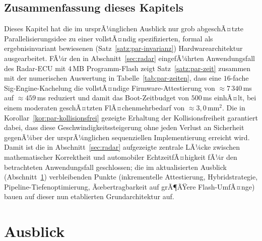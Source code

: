 ﻿\documentclass[a4paper,12pt]{article}
\theoremstyle{definition}
\begin{document}
\subsection{Zusammenfassung dieses Kapitels}

Dieses Kapitel hat die im ursprÃ¼nglichen Ausblick nur grob abgeschÃ¤tzte Parallelisierungsidee zu einer vollstÃ¤ndig spezifizierten, formal als ergebnisinvariant bewiesenen (Satz~\ref{satz:par-invarianz}) Hardwarearchitektur ausgearbeitet. FÃ¼r den in Abschnitt~\ref{sec:radar} eingefÃ¼hrten Anwendungsfall des Radar-ECU mit $4$\,MB Programm-Flash zeigt Satz~\ref{satz:par-zeit} zusammen mit der numerischen Auswertung in Tabelle~\ref{tab:par-zeiten}, dass eine $16$-fache Sig-Engine-Kachelung die vollstÃ¤ndige Firmware-Attestierung von $\approx 7\,340$\,ms auf $\approx 459$\,ms reduziert und damit das Boot-Zeitbudget von $500$\,ms einhÃ¤lt, bei einem moderaten geschÃ¤tzten FlÃ¤chenmehrbedarf von $\approx 3{,}0\,\mathrm{mm}^2$. Die in Korollar~\ref{kor:par-kollisionsfrei} gezeigte Erhaltung der Kollisionsfreiheit garantiert dabei, dass diese Geschwindigkeitssteigerung ohne jeden Verlust an Sicherheit gegenÃ¼ber der ursprÃ¼nglichen sequenziellen Implementierung erreicht wird. Damit ist die in Abschnitt~\ref{sec:radar} aufgezeigte zentrale LÃ¼cke zwischen mathematischer Korrektheit und automobiler EchtzeitfÃ¤higkeit fÃ¼r den betrachteten Anwendungsfall geschlossen; die im aktualisierten Ausblick (Abschnitt~\ref{sec:ausblick}) verbleibenden Punkte (inkrementelle Attestierung, Hybridstrategie, Pipeline-Tiefenoptimierung, Ãœbertragbarkeit auf grÃ¶ÃŸere Flash-UmfÃ¤nge) bauen auf dieser nun etablierten Grundarchitektur auf.

\section{Ausblick}
\label{sec:ausblick}
\end{document}
